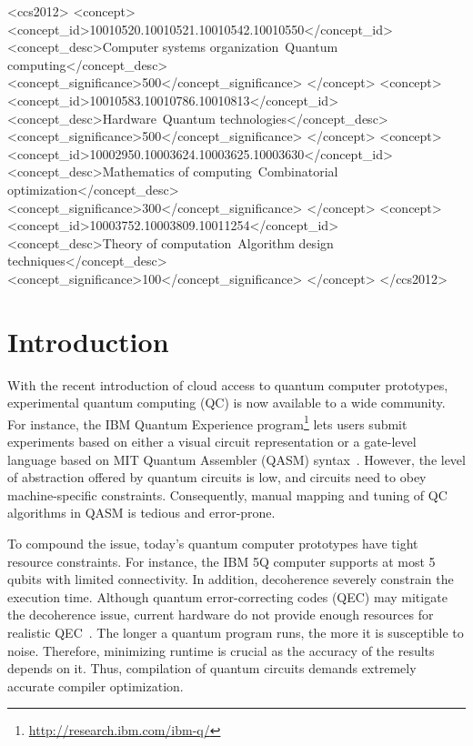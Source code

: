 \documentclass[sigplan,10pt,review,anonymous]{acmart}\settopmatter{printfolios=true}
\begin{document}
 \begin{CCSXML}
<ccs2012>
<concept>
<concept_id>10010520.10010521.10010542.10010550</concept_id>
<concept_desc>Computer systems organization~Quantum computing</concept_desc>
<concept_significance>500</concept_significance>
</concept>
<concept>
<concept_id>10010583.10010786.10010813</concept_id>
<concept_desc>Hardware~Quantum technologies</concept_desc>
<concept_significance>500</concept_significance>
</concept>
<concept>
<concept_id>10002950.10003624.10003625.10003630</concept_id>
<concept_desc>Mathematics of computing~Combinatorial optimization</concept_desc>
<concept_significance>300</concept_significance>
</concept>
<concept>
<concept_id>10003752.10003809.10011254</concept_id>
<concept_desc>Theory of computation~Algorithm design techniques</concept_desc>
<concept_significance>100</concept_significance>
</concept>
</ccs2012>
\end{CCSXML}


\maketitle


\section{Introduction}
\label{sec:intro}

With the recent introduction of cloud access to quantum computer prototypes,
experimental quantum computing (QC) is now available to a wide community.
For instance, the IBM Quantum Experience
program\footnote{\url{http://research.ibm.com/ibm-q/}} lets users submit
experiments based on either a visual circuit representation or a gate-level
language based on MIT Quantum Assembler (QASM) syntax~\cite{Cross17,Svore06}.
However, the level of abstraction offered by quantum circuits is low, and 
circuits need to obey machine-specific constraints.
Consequently, manual mapping and tuning of QC algorithms in QASM is tedious and
error-prone.

To compound the issue, today's quantum computer prototypes have tight resource
constraints.
For instance, the IBM 5Q computer supports at most 5 qubits with limited
connectivity.
In addition, decoherence severely constrain the execution time.
Although quantum error-correcting codes (QEC) may mitigate the decoherence
issue, current hardware do not provide enough resources for realistic
QEC~\cite{Cross17}.
The longer a quantum program runs, the more it is susceptible to noise.
Therefore, minimizing runtime is crucial as the accuracy of the results depends
on it.
Thus, compilation of quantum circuits demands extremely accurate compiler 
optimization.
\end{document}
